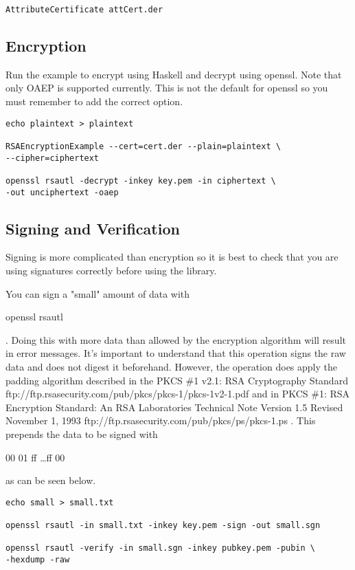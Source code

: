 \documentclass{article}
\begin{document}
\begin{lstlisting}[frame=single]
AttributeCertificate attCert.der
\end{lstlisting}

\subsection{Encryption}

Run the example to encrypt using Haskell and decrypt using openssl. Note
that only OAEP is supported currently. This is not the default for openssl
so you must remember to add the correct option.

\begin{lstlisting}[frame=single]
echo plaintext > plaintext

RSAEncryptionExample --cert=cert.der --plain=plaintext \
--cipher=ciphertext

openssl rsautl -decrypt -inkey key.pem -in ciphertext \ 
-out unciphertext -oaep
\end{lstlisting}

\subsection{Signing and Verification}

Signing is more complicated than encryption so it is best to check
that you are using signatures correctly before using the library.

You can sign a "small" amount of data with 
\begin{tt}openssl rsautl\end{tt}.
Doing this with more data than allowed by the encryption algorithm
will result in error messages. It's important to understand
that this operation signs the raw data and does not digest it
beforehand. However, the operation does apply the padding algorithm
described in the
\htmladdnormallinkfoot
{PKCS \#1 v2.1: RSA Cryptography Standard}
{ftp://ftp.rsasecurity.com/pub/pkcs/pkcs-1/pkcs-1v2-1.pdf}
and in
\htmladdnormallinkfoot
{PKCS \#1: RSA Encryption Standard: An RSA Laboratories Technical Note 
Version 1.5 Revised November 1, 1993}
{ftp://ftp.rsasecurity.com/pub/pkcs/ps/pkcs-1.ps}
. This prepends the data to be signed with 
\begin{tt}00 01 ff \ldots ff 00\end{tt} as can be seen below.

\begin{lstlisting}[frame=single]
echo small > small.txt

openssl rsautl -in small.txt -inkey key.pem -sign -out small.sgn

openssl rsautl -verify -in small.sgn -inkey pubkey.pem -pubin \
-hexdump -raw
\end{lstlisting}
\end{document}
